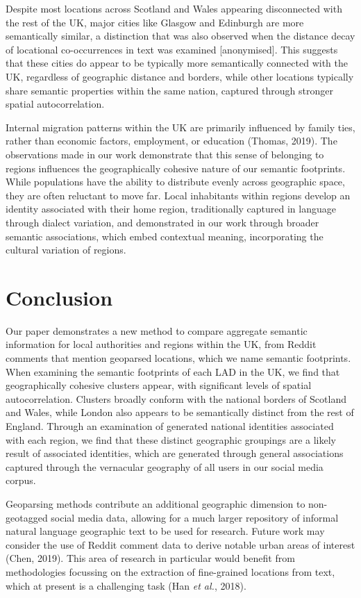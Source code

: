 \documentclass[
]{article}
\begin{document}
Despite most locations across Scotland and Wales appearing disconnected
with the rest of the UK, major cities like Glasgow and Edinburgh are
more semantically similar, a distinction that was also observed when the
distance decay of locational co-occurrences in text was examined
{[}anonymised{]}. This suggests that these cities do appear to be
typically more semantically connected with the UK, regardless of
geographic distance and borders, while other locations typically share
semantic properties within the same nation, captured through stronger
spatial autocorrelation.

Internal migration patterns within the UK are primarily influenced by
family ties, rather than economic factors, employment, or education
(Thomas, 2019). The observations made in our work demonstrate that this
sense of belonging to regions influences the geographically cohesive
nature of our semantic footprints. While populations have the ability to
distribute evenly across geographic space, they are often reluctant to
move far. Local inhabitants within regions develop an identity
associated with their home region, traditionally captured in language
through dialect variation, and demonstrated in our work through broader
semantic associations, which embed contextual meaning, incorporating the
cultural variation of regions.

\section{Conclusion}\label{sec-conclusion}

Our paper demonstrates a new method to compare aggregate semantic
information for local authorities and regions within the UK, from Reddit
comments that mention geoparsed locations, which we name semantic
footprints. When examining the semantic footprints of each LAD in the
UK, we find that geographically cohesive clusters appear, with
significant levels of spatial autocorrelation. Clusters broadly conform
with the national borders of Scotland and Wales, while London also
appears to be semantically distinct from the rest of England. Through an
examination of generated national identities associated with each
region, we find that these distinct geographic groupings are a likely
result of associated identities, which are generated through general
associations captured through the vernacular geography of all users in
our social media corpus.

Geoparsing methods contribute an additional geographic dimension to
non-geotagged social media data, allowing for a much larger repository
of informal natural language geographic text to be used for research.
Future work may consider the use of Reddit comment data to derive
notable urban areas of interest (Chen, 2019). This area of research in
particular would benefit from methodologies focussing on the extraction
of fine-grained locations from text, which at present is a challenging
task (Han \emph{et al.}, 2018).
\end{document}
